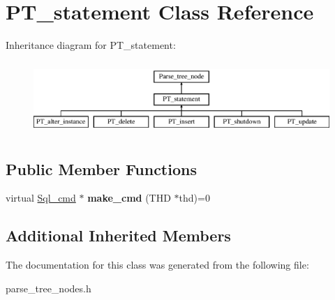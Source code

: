 \hypertarget{classPT__statement}{}\section{P\+T\+\_\+statement Class Reference}
\label{classPT__statement}
Inheritance diagram for P\+T\+\_\+statement\+:\begin{figure}[H]
\begin{center}
\leavevmode
\includegraphics[height=2.776860cm]{classPT__statement}
\end{center}
\end{figure}
\subsection*{Public Member Functions}
\begin{DoxyCompactItemize}
\item 
\mbox{\label{classPT__statement_ac05c45998f407246feba884b633ecc4b}} 
virtual \mbox{\hyperlink{classSql__cmd}{Sql\+\_\+cmd}} $\ast$ {\bfseries make\+\_\+cmd} (T\+HD $\ast$thd)=0
\end{DoxyCompactItemize}
\subsection*{Additional Inherited Members}


The documentation for this class was generated from the following file\+:\begin{DoxyCompactItemize}
\item 
parse\+\_\+tree\+\_\+nodes.\+h\end{DoxyCompactItemize}
